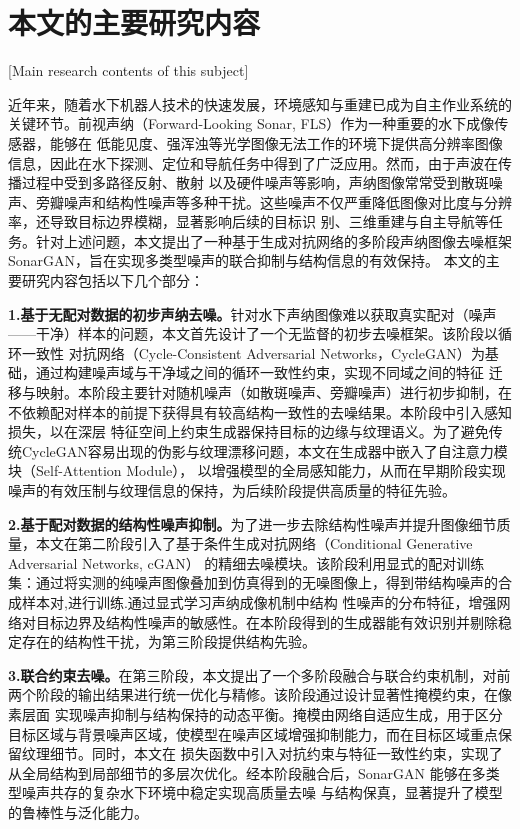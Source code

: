 \section{本文的主要研究内容}[Main research contents of this subject]

近年来，随着水下机器人技术的快速发展，环境感知与重建已成为自主作业系统的关键环节。前视声纳（Forward-Looking Sonar, FLS）作为一种重要的水下成像传感器，能够在
低能见度、强浑浊等光学图像无法工作的环境下提供高分辨率图像信息，因此在水下探测、定位和导航任务中得到了广泛应用。然而，由于声波在传播过程中受到多路径反射、散射
以及硬件噪声等影响，声纳图像常常受到散斑噪声、旁瓣噪声和结构性噪声等多种干扰。这些噪声不仅严重降低图像对比度与分辨率，还导致目标边界模糊，显著影响后续的目标识
别、三维重建与自主导航等任务。针对上述问题，本文提出了一种基于生成对抗网络的多阶段声纳图像去噪框架SonarGAN，旨在实现多类型噪声的联合抑制与结构信息的有效保持。
本文的主要研究内容包括以下几个部分：

\textbf{1.基于无配对数据的初步声纳去噪。}针对水下声纳图像难以获取真实配对（噪声——干净）样本的问题，本文首先设计了一个无监督的初步去噪框架。该阶段以循环一致性
对抗网络（Cycle-Consistent Adversarial Networks，CycleGAN）\cite{zhu2017unpaired}为基础，通过构建噪声域与干净域之间的循环一致性约束，实现不同域之间的特征
迁移与映射。本阶段主要针对随机噪声（如散斑噪声、旁瓣噪声）进行初步抑制，在不依赖配对样本的前提下获得具有较高结构一致性的去噪结果。本阶段中引入感知损失，以在深层
特征空间上约束生成器保持目标的边缘与纹理语义。为了避免传统CycleGAN容易出现的伪影与纹理漂移问题，本文在生成器中嵌入了自注意力模块（Self-Attention Module），
以增强模型的全局感知能力，从而在早期阶段实现噪声的有效压制与纹理信息的保持，为后续阶段提供高质量的特征先验。

\textbf{2.基于配对数据的结构性噪声抑制。}为了进一步去除结构性噪声并提升图像细节质量，本文在第二阶段引入了基于条件生成对抗网络（Conditional Generative Adversarial Networks, cGAN）
\cite{isola2017image}的精细去噪模块。该阶段利用显式的配对训练集：通过将实测的纯噪声图像叠加到仿真得到的无噪图像上，得到带结构噪声的合成样本对,进行训练.通过显式学习声纳成像机制中结构
性噪声的分布特征，增强网络对目标边界及结构性噪声的敏感性。在本阶段得到的生成器能有效识别并剔除稳定存在的结构性干扰，为第三阶段提供结构先验。

\textbf{3.联合约束去噪。}在第三阶段，本文提出了一个多阶段融合与联合约束机制，对前两个阶段的输出结果进行统一优化与精修。该阶段通过设计显著性掩模约束，在像素层面
实现噪声抑制与结构保持的动态平衡。掩模由网络自适应生成，用于区分目标区域与背景噪声区域，使模型在噪声区域增强抑制能力，而在目标区域重点保留纹理细节。同时，本文在
损失函数中引入对抗约束与特征一致性约束，实现了从全局结构到局部细节的多层次优化。经本阶段融合后，SonarGAN 能够在多类型噪声共存的复杂水下环境中稳定实现高质量去噪
与结构保真，显著提升了模型的鲁棒性与泛化能力。

